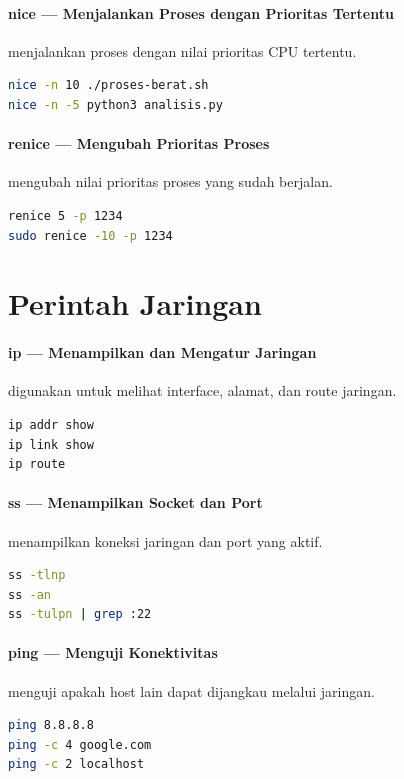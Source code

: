 \paragraph*{nice --- Menjalankan Proses dengan Prioritas Tertentu}
 menjalankan proses dengan nilai prioritas CPU tertentu.
\begin{lstlisting}[language=bash]
nice -n 10 ./proses-berat.sh
nice -n -5 python3 analisis.py
\end{lstlisting}

\paragraph*{renice --- Mengubah Prioritas Proses}
 mengubah nilai prioritas proses yang sudah berjalan.
\begin{lstlisting}[language=bash]
renice 5 -p 1234
sudo renice -10 -p 1234
\end{lstlisting}

\section{Perintah Jaringan}

\paragraph*{ip --- Menampilkan dan Mengatur Jaringan}
 digunakan untuk melihat interface, alamat, dan route jaringan.
\begin{lstlisting}[language=bash]
ip addr show
ip link show
ip route
\end{lstlisting}

\paragraph*{ss --- Menampilkan Socket dan Port}
 menampilkan koneksi jaringan dan port yang aktif.
\begin{lstlisting}[language=bash]
ss -tlnp
ss -an
ss -tulpn | grep :22
\end{lstlisting}

\paragraph*{ping --- Menguji Konektivitas}
 menguji apakah host lain dapat dijangkau melalui jaringan.
\begin{lstlisting}[language=bash]
ping 8.8.8.8
ping -c 4 google.com
ping -c 2 localhost
\end{lstlisting}

